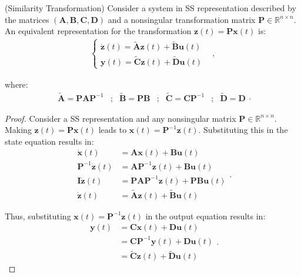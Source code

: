 \documentclass[a4paper,11pt]{book}
\numberwithin{figure}{chapter}
\numberwithin{equation}{chapter}
\numberwithin{table}{chapter}
\newtheorem{theorem}{Theorem}[chapter]
\theoremstyle{definition}
\newcounter{boxed-theorem}
\newenvironment{boxed-theorem}[1]
{\colorlet{shadecolor}{pastelBlue2!10} \begin{shaded} \begin{theorem}{#1}}
{\end{theorem} \end{shaded}}
\newcounter{boxed-definition}
\newcounter{boxed-example}
\begin{document}
\begin{boxed-theorem}{(Similarity Transformation)}
    Consider a system in SS representation described by the matrices $(\bm{A}, \bm{B}, \bm{C}, \bm{D})$ and a nonsingular transformation matrix $\bm{P} \in \mathbb{R}^{n \times n}$. An equivalent representation for the transformation $\bm{z}(t) = \bm{P} \bm{x}(t)$ is:
    \begin{align}
    \begin{cases}
        \dot{\bm{z}}(t) = \tilde{\bm{A}} \bm{z}(t) + \tilde{\bm{B}} \bm{u}(t) & \\
        \bm{y}(t) = \tilde{\bm{C}} \bm{z}(t) + \tilde{\bm{D}} \bm{u}(t)
    \end{cases} 
    ,\end{align}
    
    \noindent where:
    \begin{equation}
        \begin{matrix}
            \tilde{\bm{A}} = \bm{P} \bm{A} \bm{P}^{-1} &; & \tilde{\bm{B}} = \bm{P} \bm{B} &; & \tilde{\bm{C}} = \bm{C} \bm{P}^{-1} &; & \tilde{\bm{D}} = \bm{D}
        \end{matrix}
    .\end{equation}
\end{boxed-theorem}

\begin{proof}
    Consider a SS representation and any nonsingular matrix $\bm{P} \in \mathbb{R}^{n \times n}$. Making $\bm{z}(t) = \bm{P} \bm{x}(t)$ leads to $\bm{x}(t) = \bm{P}^{-1} \bm{z}(t)$. Substituting this in the state equation results in:
    \begin{equation}
    \begin{split}
        \dot{\bm{x}}(t) &= \bm{A} \bm{x}(t) + \bm{B} \bm{u}(t) \\
        \bm{P}^{-1} \dot{\bm{z}}(t) &= \bm{A} \bm{P}^{-1} \bm{z}(t) + \bm{B} \bm{u}(t) \\
        \bm{I} \dot{\bm{z}}(t) &= \bm{P} \bm{A} \bm{P}^{-1} \bm{z}(t) + \bm{P} \bm{B} \bm{u}(t) \\
        \dot{\bm{z}}(t) &= \tilde{\bm{A}} \bm{z}(t) + \tilde{\bm{B}} \bm{u}(t)
    \end{split}
    .\end{equation}
    
    Thus, substituting $\bm{x}(t) = \bm{P}^{-1} \bm{z}(t)$ in the output equation results in:
    \begin{equation}
    \begin{split}
        \bm{y}(t) &= \bm{C} \bm{x}(t) + \bm{D} \bm{u}(t) \\
        	&= \bm{C} \bm{P}^{-1} \bm{y}(t) + \bm{D} \bm{u}(t) \\
        	&= \tilde{\bm{C}} \bm{z}(t) + \tilde{\bm{D}} \bm{u}(t)
    \end{split}
    .\end{equation}
\end{proof}
\end{document}
